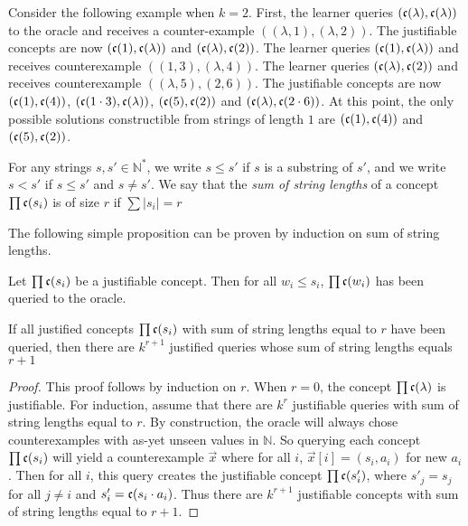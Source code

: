Consider the following example when $k = 2$. 
First, the learner queries $(\mathfrak{c}(\lambda), \mathfrak{c}(\lambda))$ to the oracle and receives a counter-example $((\lambda, 1), (\lambda, 2))$. 
The justifiable concepts are now $(\mathfrak{c}(1), \mathfrak{c}(\lambda))$ and $(\mathfrak{c}(\lambda), \mathfrak{c}(2))$. 
The learner queries $(\mathfrak{c}(1), \mathfrak{c}(\lambda))$ and receives counterexample  $((1, 3), (\lambda, 4))$. 
 The learner queries $(\mathfrak{c}(\lambda), \mathfrak{c}(2))$ and receives counterexample $((\lambda, 5), (2, 6))$.
The justifiable concepts are now  $(\mathfrak{c}(1), \mathfrak{c}(4))$, $(\mathfrak{c}(1 \cdot 3), \mathfrak{c}(\lambda))$, $(\mathfrak{c}(5), \mathfrak{c}(2))$ and $(\mathfrak{c}(\lambda), \mathfrak{c}(2 \cdot 6))$.  
At this point, the only possible solutions constructible from strings of length $1$ are $(\mathfrak{c}(1), \mathfrak{c}(4))$ and $(\mathfrak{c}(5), \mathfrak{c}(2))$. 





For any strings $s,s' \in \mathbb{N}^*$, we write $s \le s'$ if $s$ is a substring of $s'$, and we write $s < s'$ if $s \le s'$ and $s \ne s'$.
We say that the \emph{sum of string lengths} of a concept $\prod \mathfrak{c}(s_i)$ is of size $r$ if $\sum |s_i| = r$

The following simple proposition can be proven by induction on sum of string lengths.

\begin{proposition}
\label{subjust}
Let $\prod \mathfrak{c}(s_i)$ be a justifiable concept. 
Then for all $w_i \le s_i$, $\prod \mathfrak{c}(w_i)$ has been queried to the oracle.
\end{proposition}

\begin{proposition}
\label{numjustconc}
If all justified concepts $\prod \mathfrak{c}(s_i)$ with sum of string lengths equal to $r$ have been queried, then there are $k^{r+1}$ justified queries whose sum of string lengths equals $r+1$
\end{proposition}
\begin{proof}
This proof follows by induction on $r$. 
When $r=0$, the concept $\prod \mathfrak{c}(\lambda)$ is justifiable.%
For induction, assume that there are $k^r$ justifiable queries with sum of string lengths equal to $r$. 
By construction, the oracle will always chose counterexamples with as-yet unseen values in $\mathbb{N}$. 
So querying each concept $\prod \mathfrak{c}(s_i)$ will yield a counterexample $\vec{x}$ where for all $i$, $\vec{x}[i] = (s_i, a_i)$ for new $a_i$.
Then for all $i$, this query creates the justifiable concept $\prod \mathfrak{c}(s'_i)$, where $s'_j = s_j$ for all $j \ne i$ and $s'_i = \mathfrak{c}(s_i \cdot a_i)$.
Thus there are $k^{r+1}$ justifiable concepts with sum of string lengths equal to $r+1$.
\end{proof}

